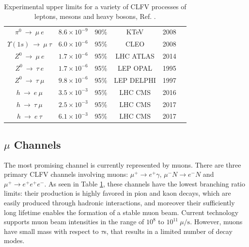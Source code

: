 \begin{center}
\begin{table}[!h]
\begin{tabular}{c c c c c c}
$\pi^0 \ \rightarrow \ \mu \ e$ & $8.6 \times 10^{-9}$ & 90\% & KTeV & 2008 & \cite{KTeV:2007cvy}\\
$\Upsilon (1s) \ \rightarrow \ \mu \ \tau $ & $6.0 \times 10^{-6}$ & 95\% & CLEO & 2008 & \cite{Love_2008}\\
\hline
$Z^0 \ \rightarrow \ \mu \ e$ & $1.7 \times 10^{-6}$ & 95\% &  LHC ATLAS & 2014 & \cite{Aad_2014} \\
$Z^0 \ \rightarrow \ \tau \ e$ & $1.7 \times 10^{-6}$ & 95\% &  LEP OPAL & 1995 & \cite{akers}\\
$Z^0 \ \rightarrow \ \tau \ \mu$ & $9.8 \times 10^{-6}$ & 95\% &  LEP DELPHI & 1997 & \cite{abreu}\\
$h \ \rightarrow \ e \ \mu$ & $3.5 \times 10^{-3}$ & 95\% & LHC CMS & 2016 & \cite{PhysRevD.104.032013}\\
$h \ \rightarrow \ \tau  \ \mu$ & $2.5 \times 10^{-3}$ & 95\% & LHC CMS & 2017 & \cite{cms17}\\
$h \ \rightarrow \ e \ \tau$ & $6.1 \times 10^{-3}$ & 95\% & LHC CMS & 2017 & \cite{cms17}\\
\hline
\end{tabular}
\caption{Experimental upper limits for a variety of CLFV processes of leptons, mesons and heavy bosons, Ref. \cite{clfv_signorelli}.}
\label{tab:upperlimits}
\end{table}
\end{center}
\vspace{-15mm}
\subsection{$\mu$ Channels}
The most promising channel is currently represented by muons. 
There are three primary CLFV channels involving muons: 
$\mu^+ \rightarrow e^+ \gamma$, $\mu^- N \rightarrow e^- N$ and $\mu^+ \rightarrow e^+ e^+ e^-$. 
As seen in Table \ref{tab:upperlimits}, 
these channels have the lowest branching ratio limits: 
their production is highly favored in pion and kaon decays, 
which are easily produced through hadronic interactions, and  
moreover their sufficiently long lifetime enables the 
formation of a stable muon beam. Current technology 
supports muon beam intensities in the range of $10^8$ to $10^{11} \ \mu/\text{s}$.
However, muons have small mass with respect to $\tau$s, that results in a limited number of decay modes. 

